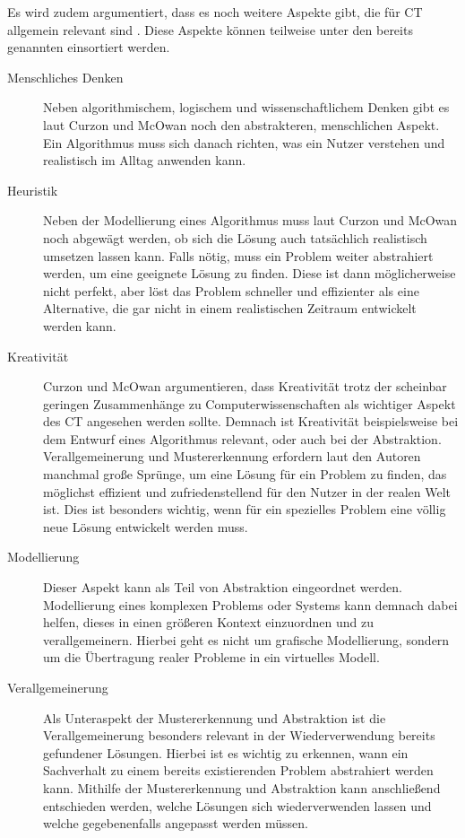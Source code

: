 Es wird zudem argumentiert, dass es noch weitere Aspekte gibt, die für CT allgemein relevant sind \cite{curzon}. Diese Aspekte können teilweise unter den bereits genannten einsortiert werden.

\begin{description}
    \item[Menschliches Denken] Neben algorithmischem, logischem und wissenschaftlichem Denken gibt es laut Curzon und McOwan \cite{curzon} noch den abstrakteren, menschlichen Aspekt. Ein Algorithmus muss sich danach richten, was ein Nutzer verstehen und realistisch im Alltag anwenden kann.
    \item[Heuristik] Neben der Modellierung eines Algorithmus muss laut Curzon und McOwan noch abgewägt werden, ob sich die Lösung auch tatsächlich realistisch umsetzen lassen kann. Falls nötig, muss ein Problem weiter abstrahiert werden, um eine geeignete Lösung zu finden. Diese ist dann möglicherweise nicht perfekt, aber löst das Problem schneller und effizienter als eine Alternative, die gar nicht in einem realistischen Zeitraum entwickelt werden kann.
    \item[Kreativität] Curzon und McOwan argumentieren, dass Kreativität trotz der scheinbar geringen Zusammenhänge zu Computerwissenschaften als wichtiger Aspekt des CT angesehen werden sollte. Demnach ist Kreativität beispielsweise bei dem Entwurf eines Algorithmus relevant, oder auch bei der Abstraktion. Verallgemeinerung und Mustererkennung erfordern laut den Autoren manchmal große Sprünge, um eine Lösung für ein Problem zu finden, das möglichst effizient und zufriedenstellend für den Nutzer in der realen Welt ist. Dies ist besonders wichtig, wenn für ein spezielles Problem eine völlig neue Lösung entwickelt werden muss.
    \item[Modellierung] Dieser Aspekt kann als Teil von Abstraktion eingeordnet werden. Modellierung eines komplexen Problems oder Systems kann demnach dabei helfen, dieses in einen größeren Kontext einzuordnen und zu verallgemeinern. Hierbei geht es nicht um grafische Modellierung, sondern um die Übertragung realer Probleme in ein virtuelles Modell.
    \item[Verallgemeinerung] Als Unteraspekt der Mustererkennung und Abstraktion ist die Verallgemeinerung besonders relevant in der Wiederverwendung bereits gefundener Lösungen. Hierbei ist es wichtig zu erkennen, wann ein Sachverhalt zu einem bereits existierenden Problem abstrahiert werden kann. Mithilfe der Mustererkennung und Abstraktion kann anschließend entschieden werden, welche Lösungen sich wiederverwenden lassen und welche gegebenenfalls angepasst werden müssen.

\end{description}

